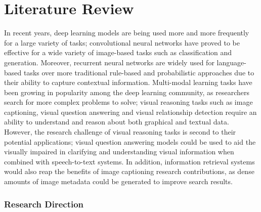 \chapter{Literature Review}

In recent years, deep learning models are being used more and more frequently for a large variety of tasks; convolutional neural networks have proved to be effective for a wide variety of image-based tasks such as classification and generation. Moreover, recurrent neural networks are widely used for language-based tasks over more traditional rule-based and probabilistic approaches due to their ability to capture contextual information. Multi-modal learning tasks have been growing in popularity among the deep learning community, as researchers search for more complex problems to solve; visual reasoning tasks such as image captioning, visual question answering and visual relationship detection require an ability to understand and reason about both graphical and textual data. However, the research challenge of visual reasoning tasks is second to their potential applications; visual question answering models could be used to aid the visually impaired in clarifying and understanding visual information when combined with speech-to-text systems. In addition, information retrieval systems would also reap the benefits of image captioning research contributions, as dense amounts of image metadata could be generated to improve search results.

\subsection*{Research Direction}

